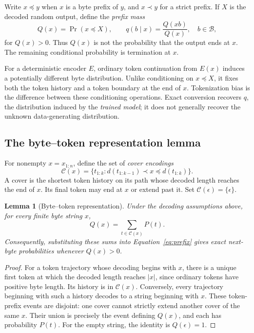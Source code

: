 \documentclass{article}
\newtheorem{lemma}{Lemma}
\newcommand{\bytes}{\mathcal{B}}
\newcommand{\cover}{\mathcal{C}}
\newcommand{\decode}{d}
\newcommand{\encode}{E}
\newcommand{\emptyseq}{\epsilon}
\begin{document}
Write $x\preceq y$ when $x$ is a byte prefix of $y$, and $x\prec y$ for a strict prefix. If $X$ is the decoded random output, define the \emph{prefix mass}
\begin{equation}
 Q(x)=\Pr(x\preceq X),\qquad
 q(b\mid x)=\frac{Q(xb)}{Q(x)},\quad b\in\bytes,
 \label{eq:prefix}
\end{equation}
for $Q(x)>0$. Thus $Q(x)$ is not the probability that the output ends at $x$. The remaining conditional probability is termination at $x$.

For a deterministic encoder $\encode$, ordinary token continuation from $\encode(x)$ induces a potentially different byte distribution. Unlike conditioning on $x\preceq X$, it fixes both the token history and a token boundary at the end of $x$. Tokenization bias is the difference between these conditioning operations. Exact conversion recovers $q$, the distribution induced by the \emph{trained model}; it does not generally recover the unknown data-generating distribution.

\subsection{The byte--token representation lemma}
\label{sec:lemma}
For nonempty $x=x_{1:n}$, define the set of \emph{cover encodings}
\begin{equation}
 \cover(x)=\big\{t_{1:k}:\decode(t_{1:k-1})\prec x
                  \preceq\decode(t_{1:k})\big\}.
 \label{eq:cover}
\end{equation}
A cover is the shortest token history on its path whose decoded length reaches the end of $x$. Its final token may end at $x$ or extend past it. Set $\cover(\emptyseq)=\{\emptyseq\}$.

\begin{lemma}[Byte--token representation]
\label{lem:representation}
Under the decoding assumptions above, for every finite byte string $x$,
\begin{equation}
 Q(x)=\sum_{t\in\cover(x)}P(t).
 \label{eq:representation}
\end{equation}
Consequently, substituting these sums into Equation~\ref{eq:prefix} gives exact next-byte probabilities whenever $Q(x)>0$.
\end{lemma}
\begin{proof}
For a token trajectory whose decoding begins with $x$, there is a unique first token at which the decoded length reaches $|x|$, since ordinary tokens have positive byte length. Its history is in $\cover(x)$. Conversely, every trajectory beginning with such a history decodes to a string beginning with $x$. These token-prefix events are disjoint: one cover cannot strictly extend another cover of the same $x$. Their union is precisely the event defining $Q(x)$, and each has probability $P(t)$. For the empty string, the identity is $Q(\emptyseq)=1$.
\end{proof}
\end{document}
